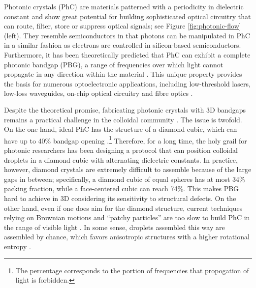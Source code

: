 Photonic crystals (PhC) are materials patterned with a periodicity in dielectric constant and show great potential for building sophisticated optical circuitry that can route, filter, store or suppress optical signals; see Figure \ref{fig:photonic-flow} (left).
They resemble semiconductors in that photons can be manipulated in PhC in a similar fashion as electrons are controlled in silicon-based semiconductors.
Furthermore, it has been theoretically predicted that PhC can exhibit a complete photonic bandgap (PBG), \ie a range of frequencies over which light cannot propagate in any direction within the material \citep{Yablonovitch1987}.
This unique property provides the basis for numerous optoelectronic applications, including low-threshold lasers, low-loss waveguides, on-chip optical circuitry and fibre optics \citep{Meade_etal_1994, Joannopoulos_etal_1997, Rinne_etal_2008}.

Despite the theoretical promise, fabricating photonic crystals with 3D bandgaps remains a practical challenge in the colloidal community \citep{Velev_etal_AM2009, Sacanna_etal_COCIS2011, Shen_AS_2016}.
The issue is twofold.
On the one hand, ideal PhC has the structure of a diamond cubic, which can have up to 40\% bandgap opening \citep{PRL1990}.\footnote{The percentage corresponds to the portion of frequencies that propogation of light is forbidden.}
Therefore, for a long time, the holy grail for photonic researchers has been designing a protocol that can position colloidal droplets in a diamond cubic with alternating dielectric constants.
In practice, however, diamond crystals are extremely difficult to assemble because of the large gaps in between; specifically, a diamond cubic of equal spheres has at most 34\% packing fraction, while a face-centered cubic can reach 74\%. This makes PBG hard to achieve in 3D considering its sensitivity to structural defects.
On the other hand, even if one does aim for the diamond structure, current techniques relying on Brownian motions and ``patchy particles'' are too slow to build PhC in the range of visible light \citep{Yi_etal_CM2013}. In some sense, droplets assembled this way are assembled by chance, which favors anisotropic structures with a higher rotational entropy \citep{Meng2010}.

